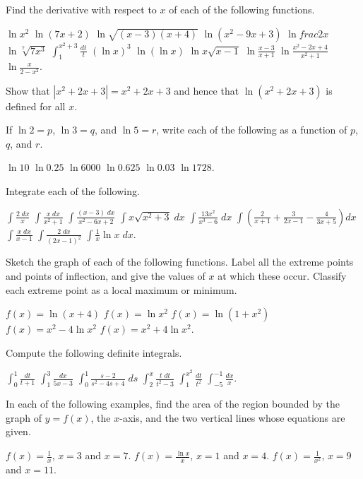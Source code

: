 \begin{exercises}

Find the derivative with respect to $x$
of each of the following functions.
\begin{exenum}
\x
$\ln x^2$
\x
$\ln(7x + 2)$
\x
$\ln \sqrt{(x-3)(x+4)}$
\x
$\ln(x^2 - 9x + 3)$
\x
$\ln frac2x$
\x
$\ln \sqrt[7]{7x^3}$
\x
$\int_1^{x^2+3} \frac{dt}t$
\x
$(\ln x)^3$
\x
$\ln(\ln x)$
\x
$\ln x\sqrt{x-1}$
\x
$\ln \frac{x-3}{x+1}$
\x
$\ln \frac{x^2-2x+4}{x^2+1}$
\x
$\ln \frac{x}{2-x^2}$.
\end{exenum}

Show that $|x^2 + 2x + 3| = x^2 + 2x + 3$ and hence that
$\ln(x^2 + 2x + 3)$ is defined for all $x$.

If $\ln 2 = p$, $\ln 3 = q$, and $\ln 5 = r$,
write each of the following as a function of
$p$, $q$, and $r$.
\begin{exenum}
\x
$\ln 10$
\x
$\ln 0.25$
\x
$\ln 6000$
\x
$\ln 0.625$
\x
$\ln 0.03$
\x
$\ln 1728$.
\end{exenum}

Integrate each of the following.
\begin{exenum}
\x
$\int \frac{2\;dx}x$
\x
$\int \frac{x\;dx}{x^2+1}$
\x
$\int \frac{(x-3)\;dx}{x^2-6x+2}$
\x
$\int x\sqrt{x^2+3}\;dx$
\x
$\int \frac{13x^2}{x^3-6}\;dx$
\x
$\int \left(\frac2{x+1} + \frac3{2x-1} - \frac4{3x+5}\right)dx$
\x
$\int \frac{x\;dx}{x-1}$
\x
$\int \frac{2\;dx}{(2x-1)^2}$
\x
$\int \frac1x \ln x\;dx$.
\end{exenum}

Sketch the graph of each of the following functions.
Label all the extreme points and points of inflection,
and give the values of $x$ at which these occur.
Classify each extreme point as a local maximum
or minimum.
\begin{exenum}
\x
$f(x) = \ln(x+4)$
\x
$f(x) = \ln x^2$
\x
$f(x) = \ln(1+x^2)$
\x
$f(x) = x^2 - 4 \ln x^2$
\x
$f(x) = x^2 + 4 \ln x^2$.
\end{exenum}

Compute the following definite integrals.
\begin{exenum}
\x
$\int_0^1 \frac{dt}{t+1}$
\x
$\int_1^3 \frac{dx}{5x-3}$
\x
$\int_0^1 \frac{s-2}{s^2-4s+4} \; ds$
\x
$\int_2^x \frac{t\;dt}{t^2-3}$
\x
$\int_1^{x^2} \frac{dt}{t^2}$
\x
$\int_{-5}^{-1} \frac{dx}x$.
\end{exenum}

In each of the following examples, find the area
of the region bounded by the graph of
$y = f(x)$, the $x$-axis, and the two vertical
lines whose equations are given.
\begin{exenum}
\x
$f(x) = \frac1x$, $x=3$ and $x=7$.
\x
$f(x) = \frac{\ln x}{x}$, $x=1$ and $x=4$.
\x
$f(x) = \frac1{x^2}$, $x=9$ and $x=11$.
\end{exenum}


\end{exercises}

